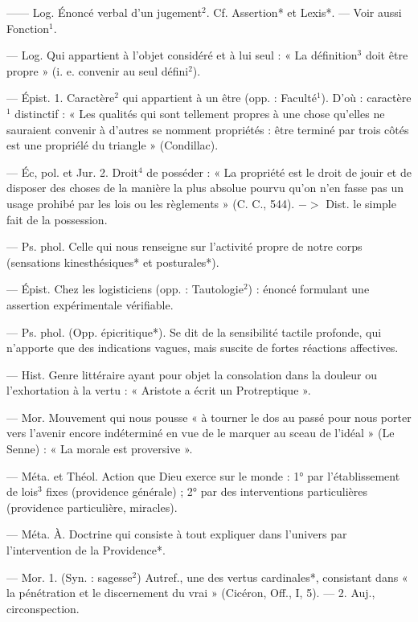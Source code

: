 \begin{itemize}[leftmargin=1cm, label=, itemsep=1pt]
 —— Log. Énoncé verbal
d’un jugement$^2$. Cf. Assertion* et
Lexis*. — Voir aussi Fonction$^1$.

 — Log. Qui appartient à
l’objet considéré et à lui seul : « La
définition$^3$ doit être propre » (i. e.
convenir au seul défini$^2$).

 — Épist. 1. Caractère$^2$ qui
appartient à un être (opp. : Faculté$^1$).
D'où : caractère$^1$ distinctif : « Les
qualités qui sont tellement propres
à une chose qu'elles ne sauraient
convenir à d’autres se nomment
propriétés : être terminé par trois
côtés est une propriélé du triangle »
(Condillac).

— Éc, pol. et Jur. 2. Droit$^4$ de
posséder : « La propriété est le droit
de jouir et de disposer des choses
de la manière la plus absolue pourvu
qu’on n’en fasse pas un usage prohibé
par les lois ou les règlements » (C. C.,
544). $->$ Dist. le simple fait de la
possession.

 — Ps. phol.
Celle qui nous renseigne sur l’activité propre de notre corps (sensations kinesthésiques* et posturales*).

 — Épist. Chez les logisticiens
(opp. : Tautologie$^2$) : énoncé formulant une assertion expérimentale
vérifiable.

 — Ps. phol. (Opp.
épicritique*). Se dit de la sensibilité
tactile profonde, qui n’apporte que
des indications vagues, mais suscite
de fortes réactions affectives.

 — Hist. Genre littéraire
ayant pour objet la consolation
dans la douleur ou l’exhortation
à la vertu : « Aristote a écrit un
Protreptique ».

 — Mor. Mouvement qui
nous pousse « à tourner le dos au
passé pour nous porter vers l'avenir
encore indéterminé en vue de le
marquer au sceau de l'idéal » (Le
Senne) : « La morale est proversive ».

 — Méta. et Théol. Action
que Dieu exerce sur le monde : 1° par
l'établissement de lois$^3$ fixes (providence générale) ; 2° par des interventions particulières (providence
particulière, miracles).

 — Méta. À. Doctrine qui consiste à tout expliquer
dans l’univers par l'intervention de
la Providence*.

 — Mor. 1. (Syn. : sagesse$^2$)
Autref., une des vertus cardinales*,
consistant dans « la pénétration et
le discernement du vrai » (Cicéron,
Off., I, 5). — 2. Auj., circonspection.


\end{itemize}
